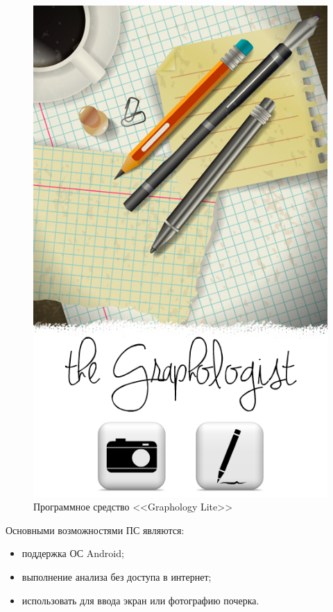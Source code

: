 \begin{figure}[h]
    \centering
    \includegraphics[height=0.5\textheight]{figures/analog_graphology_lite.png}
    \caption{Программное средство <<Graphology Lite>>}
    \label{fig:domain:analogs:graphology_lite}
\end{figure}

Основными возможностями ПС являются:
\begin{itemize}
  \item поддержка ОС Android;
  \item выполнение анализа без доступа в интернет;
  \item использовать для ввода экран или фотографию почерка.
\end{itemize}

